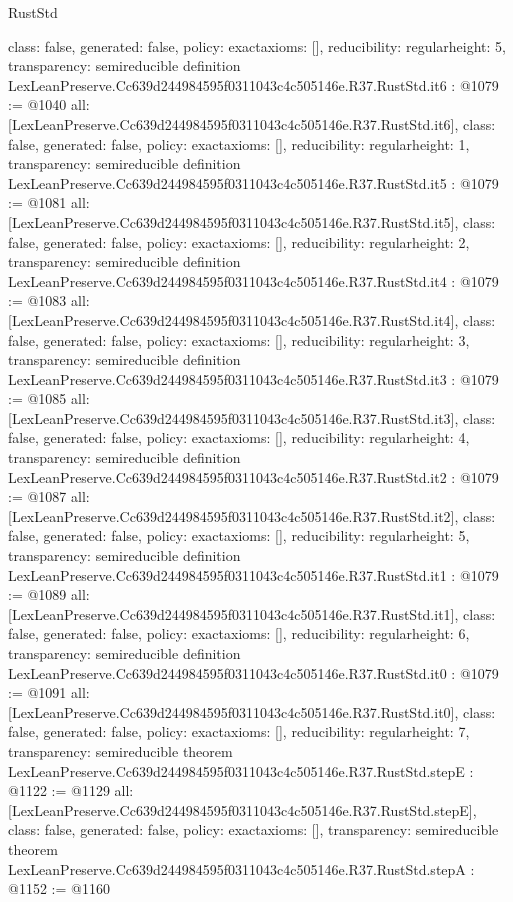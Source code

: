 \begin{lexlean}{RustStd}
\begin{coremodule}
{  class: false,
  generated: false,
  policy: exact{axioms: []},
  reducibility: regular{height: 5},
  transparency: semireducible
}
definition LexLeanPreserve.Cc639d244984595f0311043c4c505146e.R37.RustStd.it6 : @1079 := @1040 {
  all: [LexLeanPreserve.Cc639d244984595f0311043c4c505146e.R37.RustStd.it6],
  class: false,
  generated: false,
  policy: exact{axioms: []},
  reducibility: regular{height: 1},
  transparency: semireducible
}
definition LexLeanPreserve.Cc639d244984595f0311043c4c505146e.R37.RustStd.it5 : @1079 := @1081 {
  all: [LexLeanPreserve.Cc639d244984595f0311043c4c505146e.R37.RustStd.it5],
  class: false,
  generated: false,
  policy: exact{axioms: []},
  reducibility: regular{height: 2},
  transparency: semireducible
}
definition LexLeanPreserve.Cc639d244984595f0311043c4c505146e.R37.RustStd.it4 : @1079 := @1083 {
  all: [LexLeanPreserve.Cc639d244984595f0311043c4c505146e.R37.RustStd.it4],
  class: false,
  generated: false,
  policy: exact{axioms: []},
  reducibility: regular{height: 3},
  transparency: semireducible
}
definition LexLeanPreserve.Cc639d244984595f0311043c4c505146e.R37.RustStd.it3 : @1079 := @1085 {
  all: [LexLeanPreserve.Cc639d244984595f0311043c4c505146e.R37.RustStd.it3],
  class: false,
  generated: false,
  policy: exact{axioms: []},
  reducibility: regular{height: 4},
  transparency: semireducible
}
definition LexLeanPreserve.Cc639d244984595f0311043c4c505146e.R37.RustStd.it2 : @1079 := @1087 {
  all: [LexLeanPreserve.Cc639d244984595f0311043c4c505146e.R37.RustStd.it2],
  class: false,
  generated: false,
  policy: exact{axioms: []},
  reducibility: regular{height: 5},
  transparency: semireducible
}
definition LexLeanPreserve.Cc639d244984595f0311043c4c505146e.R37.RustStd.it1 : @1079 := @1089 {
  all: [LexLeanPreserve.Cc639d244984595f0311043c4c505146e.R37.RustStd.it1],
  class: false,
  generated: false,
  policy: exact{axioms: []},
  reducibility: regular{height: 6},
  transparency: semireducible
}
definition LexLeanPreserve.Cc639d244984595f0311043c4c505146e.R37.RustStd.it0 : @1079 := @1091 {
  all: [LexLeanPreserve.Cc639d244984595f0311043c4c505146e.R37.RustStd.it0],
  class: false,
  generated: false,
  policy: exact{axioms: []},
  reducibility: regular{height: 7},
  transparency: semireducible
}
theorem LexLeanPreserve.Cc639d244984595f0311043c4c505146e.R37.RustStd.stepE : @1122 := @1129 {
  all: [LexLeanPreserve.Cc639d244984595f0311043c4c505146e.R37.RustStd.stepE],
  class: false,
  generated: false,
  policy: exact{axioms: []},
  transparency: semireducible
}
theorem LexLeanPreserve.Cc639d244984595f0311043c4c505146e.R37.RustStd.stepA : @1152 := @1160 {
}
\end{coremodule}
\end{lexlean}
